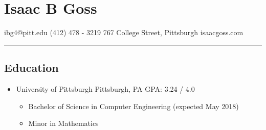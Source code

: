 \documentclass[18pt]{article}
\providecommand{\tightlist}{
    \setlength{\itemsep}{0pt}\setlength{\parskip}{0pt}
}
\begin{document}
  \section*{Isaac B Goss}\label{isaac-b-goss}
    ibg4@pitt.edu \textbar{} (412) 478 - 3219 \textbar{} 767 College Street, Pittsburgh \textbar{} isaacgoss.com
    
    \hrule
    
    \subsection*{Education}\label{education}      
      \begin{itemize}\tightlist
        \item University of Pittsburgh \textbar{} Pittsburgh, PA \textbar{} GPA: 3.24 / 4.0
        \begin{itemize}\tightlist
          \item Bachelor of Science in Computer Engineering (expected May 2018)
          \item Minor in Mathematics
        \end{itemize}
      \end{itemize}
      
\end{document}
